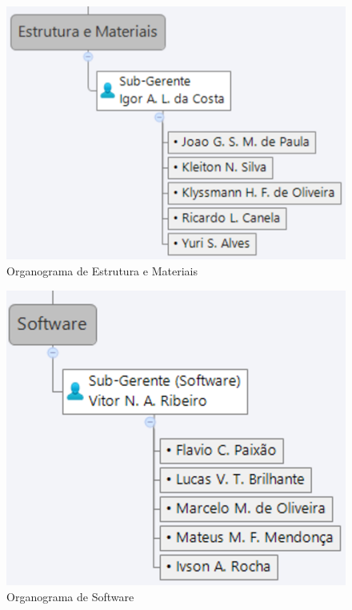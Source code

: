 \begin{figure}[H]
  \begin{center}
	\includegraphics[keepaspectratio,scale=0.6]{figuras/estrutura_materiais.eps}
	\caption{Organograma de Estrutura e Materiais}
  \end{center}
\end{figure}

\begin{figure}[H]
  \begin{center}
	\includegraphics[keepaspectratio,scale=0.6]{figuras/software.eps}
	\caption{Organograma de Software}
  \end{center}
\end{figure}

